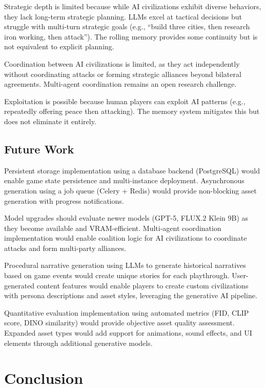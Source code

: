 \documentclass[conference]{IEEEtran}
\begin{document}
Strategic depth is limited because while AI civilizations exhibit diverse behaviors, they lack long-term strategic planning. LLMs excel at tactical decisions but struggle with multi-turn strategic goals (e.g., ``build three cities, then research iron working, then attack''). The rolling memory provides some continuity but is not equivalent to explicit planning.

Coordination between AI civilizations is limited, as they act independently without coordinating attacks or forming strategic alliances beyond bilateral agreements. Multi-agent coordination remains an open research challenge.

Exploitation is possible because human players can exploit AI patterns (e.g., repeatedly offering peace then attacking). The memory system mitigates this but does not eliminate it entirely.

\subsection{Future Work}

Persistent storage implementation using a database backend (PostgreSQL) would enable game state persistence and multi-instance deployment. Asynchronous generation using a job queue (Celery + Redis) would provide non-blocking asset generation with progress notifications.

Model upgrades should evaluate newer models (GPT-5, FLUX.2 Klein 9B) as they become available and VRAM-efficient. Multi-agent coordination implementation would enable coalition logic for AI civilizations to coordinate attacks and form multi-party alliances.

Procedural narrative generation using LLMs to generate historical narratives based on game events would create unique stories for each playthrough. User-generated content features would enable players to create custom civilizations with persona descriptions and asset styles, leveraging the generative AI pipeline.

Quantitative evaluation implementation using automated metrics (FID, CLIP score, DINO similarity) would provide objective asset quality assessment. Expanded asset types would add support for animations, sound effects, and UI elements through additional generative models.

\section{Conclusion}
\label{sec:conclusion}
\end{document}
